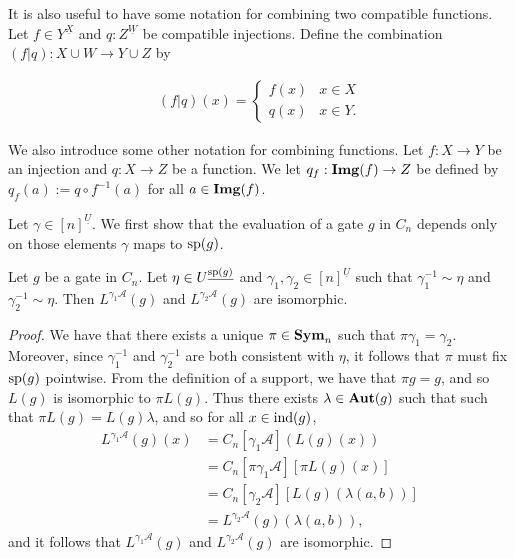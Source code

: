\documentclass[../paper.tex]{subfiles}
\begin{document}
It is also useful to have some notation for combining two compatible functions.
Let $f \in Y^{\underline{X}}$ and $q : Z^{\underline{W}}$ be compatible
injections. Define the combination $(f | q): X \cup W \rightarrow Y \cup Z$ by

\begin{align*}
	(f \vert q) (x) =
	\begin{cases}
    f (x) & x \in X  \\
    q (x) & x \in Y.
	\end{cases}
\end{align*}

We also introduce some other notation for combining functions. Let $f: X
\rightarrow Y$ be an injection and $q: X \rightarrow Z$ be a function. We let
$q_f : \text{\textbf{Img}}(f) \rightarrow Z$ be defined by $q_f(a) := q \circ f^{-1}(a)$ for
all $a \in \text{\textbf{Img}}(f)$.


Let $\gamma \in [n]^{\underline{U}}$. We first show that the evaluation of a
gate $g$ in $C_n$ depends only on those elements $\gamma$ maps to $\text{sp}(g)$.

\begin{lem}
	Let $g$ be a gate in $C_n$. Let $\eta \in U^{\underline{\text{sp}(g)}}$ and
  $\gamma_1, \gamma_2 \in [n]^{\underline{U}}$ such that $\gamma^{-1}_1 \sim
  \eta$ and $\gamma^{-1}_2 \sim \eta$. Then $L^{\gamma_1 \mathcal{A}}(g)$ and
  $L^{\gamma_2 \mathcal{A}}(g)$ are isomorphic.
	\label{lem:support-determines-evaluation}
\end{lem}

\begin{proof}
	We have that there exists a unique $\pi \in \text{\textbf{Sym}}_n$ such that $\pi \gamma_1 =
  \gamma_2$. Moreover, since $\gamma^{-1}_1$ and $\gamma^{-1}_2$ are both
  consistent with $\eta$, it follows that $\pi$ must fix $\text{sp}(g)$ pointwise.
  From the definition of a support, we have that $\pi g = g$, and so $L(g)$ is
  isomorphic to $\pi L(g)$. Thus there exists $\lambda \in \text{\textbf{Aut}}(g)$
  such that such that $\pi L(g) = L(g) \lambda$, and so for all $x \in \text{\upshape ind}(g)$,
	\begin{align*}
		L^{\gamma_1 \mathcal{A}}(g) (x) & = C_n[\gamma_1 \mathcal{A}](L(g)(x))                    \\
                                    & = C_n[\pi \gamma_1 \mathcal{A}][\pi L(g)(x)]            \\
                                    & = C_n[\gamma_2 \mathcal{A}][L(g)(\lambda(a,b))] \\
                                    & = L^{\gamma_2 \mathcal{A}}(g) (\lambda (a,b)),                 
	\end{align*}
	and it follows that $L^{\gamma_1 \mathcal{A}}(g)$ and $L^{\gamma_2
    \mathcal{A}}(g)$ are isomorphic.
\end{proof}
\end{document}
